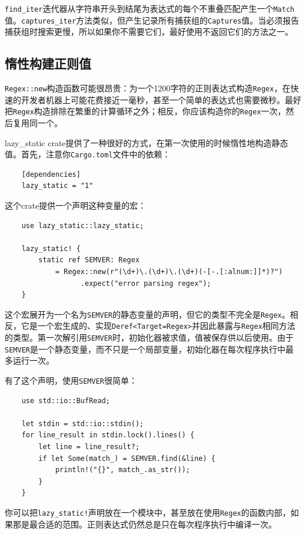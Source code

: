 \texttt{find\_iter}迭代器从字符串开头到结尾为表达式的每个不重叠匹配产生一个\texttt{Match}值。\texttt{captures\_iter}方法类似，但产生记录所有捕获组的\texttt{Captures}值。当必须报告捕获组时搜索更慢，所以如果你不需要它们，最好使用不返回它们的方法之一。

\subsection{惰性构建正则值}\label{LazyRegex}

\texttt{Regex::new}构造函数可能很昂贵：为一个1200字符的正则表达式构造\texttt{Regex}，在快速的开发者机器上可能花费接近一毫秒，甚至一个简单的表达式也需要微秒。最好把\texttt{Regex}构造排除在繁重的计算循环之外；相反，你应该构造你的\texttt{Regex}一次，然后复用同一个。

lazy\_static crate提供了一种很好的方式，在第一次使用的时候惰性地构造静态值。首先，注意你\texttt{Cargo.toml}文件中的依赖：
\begin{verbatim}
    [dependencies]
    lazy_static = "1"
\end{verbatim}

这个crate提供一个声明这种变量的宏：
\begin{verbatim}
    use lazy_static::lazy_static;

    lazy_static! {
        static ref SEMVER: Regex
            = Regex::new(r"(\d+)\.(\d+)\.(\d+)(-[-.[:alnum:]]*)?")
                  .expect("error parsing regex");
    }
\end{verbatim}

这个宏展开为一个名为\texttt{SEMVER}的静态变量的声明，但它的类型不完全是\texttt{Regex}。相反，它是一个宏生成的、实现\texttt{Deref<Target=Regex>}并因此暴露与\texttt{Regex}相同方法的类型。第一次解引用\texttt{SEMVER}时，初始化器被求值，值被保存供以后使用。由于\texttt{SEMVER}是一个静态变量，而不只是一个局部变量，初始化器在每次程序执行中最多运行一次。

有了这个声明，使用\texttt{SEMVER}很简单：
\begin{verbatim}
    use std::io::BufRead;

    let stdin = std::io::stdin();
    for line_result in stdin.lock().lines() {
        let line = line_result?;
        if let Some(match_) = SEMVER.find(&line) {
            println!("{}", match_.as_str());
        }
    }
\end{verbatim}

你可以把\texttt{lazy\_static!}声明放在一个模块中，甚至放在使用\texttt{Regex}的函数内部，如果那是最合适的范围。正则表达式仍然总是只在每次程序执行中编译一次。

